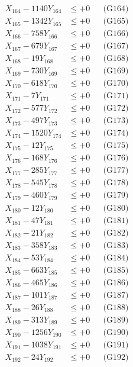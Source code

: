 \documentclass[a4paper,10pt]{article}
\begin{document}
{\begin{align}
X_{164} - 1140Y_{164} &\leq +0 && \text{(G164)} \\
X_{165} - 1342Y_{165} &\leq +0 && \text{(G165)} \\
X_{166} - 758Y_{166} &\leq +0 && \text{(G166)} \\
X_{167} - 679Y_{167} &\leq +0 && \text{(G167)} \\
X_{168} - 19Y_{168} &\leq +0 && \text{(G168)} \\
X_{169} - 730Y_{169} &\leq +0 && \text{(G169)} \\
X_{170} - 618Y_{170} &\leq +0 && \text{(G170)} \\
\allowbreak
X_{171} - 7Y_{171} &\leq +0 && \text{(G171)} \\
X_{172} - 577Y_{172} &\leq +0 && \text{(G172)} \\
X_{173} - 497Y_{173} &\leq +0 && \text{(G173)} \\
X_{174} - 1520Y_{174} &\leq +0 && \text{(G174)} \\
X_{175} - 12Y_{175} &\leq +0 && \text{(G175)} \\
X_{176} - 168Y_{176} &\leq +0 && \text{(G176)} \\
X_{177} - 285Y_{177} &\leq +0 && \text{(G177)} \\
X_{178} - 545Y_{178} &\leq +0 && \text{(G178)} \\
X_{179} - 460Y_{179} &\leq +0 && \text{(G179)} \\
X_{180} - 12Y_{180} &\leq +0 && \text{(G180)} \\
\allowbreak
X_{181} - 47Y_{181} &\leq +0 && \text{(G181)} \\
X_{182} - 21Y_{182} &\leq +0 && \text{(G182)} \\
X_{183} - 358Y_{183} &\leq +0 && \text{(G183)} \\
X_{184} - 53Y_{184} &\leq +0 && \text{(G184)} \\
X_{185} - 663Y_{185} &\leq +0 && \text{(G185)} \\
X_{186} - 465Y_{186} &\leq +0 && \text{(G186)} \\
X_{187} - 101Y_{187} &\leq +0 && \text{(G187)} \\
X_{188} - 26Y_{188} &\leq +0 && \text{(G188)} \\
X_{189} - 313Y_{189} &\leq +0 && \text{(G189)} \\
X_{190} - 1256Y_{190} &\leq +0 && \text{(G190)} \\
\allowbreak
X_{191} - 1038Y_{191} &\leq +0 && \text{(G191)} \\
X_{192} - 24Y_{192} &\leq +0 && \text{(G192)} \\

\end{align}}
\end{document}
